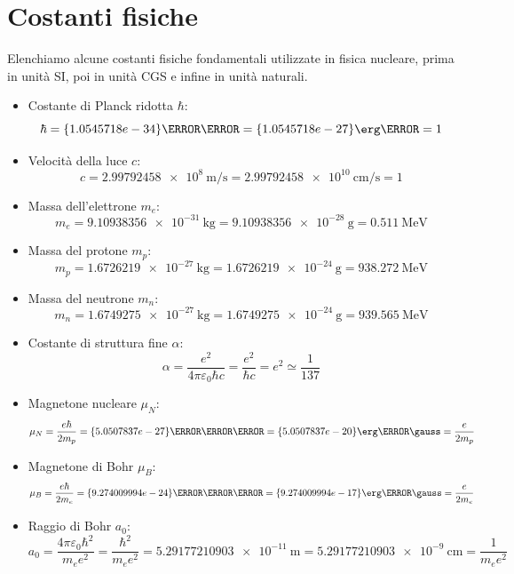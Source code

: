 \section{Costanti fisiche}
Elenchiamo alcune costanti fisiche fondamentali utilizzate in fisica nucleare, prima in unità SI, poi in unità CGS e infine in unità naturali.
\begin{itemize}
    \item Costante di Planck ridotta $\hbar$:
    \begin{equation}
        \hbar = \qty{1.0545718e-34}{\joule\second} = \qty{1.0545718e-27}{\erg\second} = 1
    \end{equation}
    \item Velocità della luce $c$:
    \begin{equation}
        c = \qty{2.99792458e8}{\meter\per\second} = \qty{2.99792458e10}{\centi\meter\per\second} = 1
    \end{equation}
    \item Massa dell'elettrone $m_e$:
    \begin{equation}
        m_e = \qty{9.10938356e-31}{\kilo\gram} = \qty{9.10938356e-28}{\gram} = \qty{0.511}{\mega\electronvolt}
    \end{equation}
    \item Massa del protone $m_p$:
    \begin{equation}
        m_p = \qty{1.6726219e-27}{\kilo\gram} = \qty{1.6726219e-24}{\gram} = \qty{938.272}{\mega\electronvolt}
    \end{equation}
    \item Massa del neutrone $m_n$:
    \begin{equation}
        m_n = \qty{1.6749275e-27}{\kilo\gram} = \qty{1.6749275e-24}{\gram} = \qty{939.565}{\mega\electronvolt}
    \end{equation}
    \item Costante di struttura fine $\alpha$:
    \begin{equation}
        \alpha = \dfrac{e^2}{4\pi\varepsilon_0 \hbar c} = \dfrac{e^2}{\hbar c} = e^2 \simeq \dfrac{1}{137}
    \end{equation}
    \item Magnetone nucleare $\mu_N$:
    \begin{equation}
        \mu_N = \dfrac{e \hbar}{2 m_p} = \qty{5.0507837e-27}{\joule\per\tesla} = \qty{5.0507837e-20}{\erg\per\gauss} = \dfrac{e}{2 m_p}
    \end{equation}
    \item Magnetone di Bohr $\mu_B$:
    \begin{equation}
        \mu_B = \dfrac{e \hbar}{2 m_e} = \qty{9.274009994e-24}{\joule\per\tesla} = \qty{9.274009994e-17}{\erg\per\gauss} = \dfrac{e}{2 m_e}
    \end{equation}
    \item Raggio di Bohr $a_0$:
    \begin{equation}
        a_0 = \dfrac{4\pi\varepsilon_0 \hbar^2}{m_e e^2} = \dfrac{\hbar^2}{m_e e^2} = \qty{5.29177210903e-11}{\meter} = \qty{5.29177210903e-9}{\centi\meter} = \dfrac{1}{m_e e^2}
    \end{equation}
\end{itemize}
